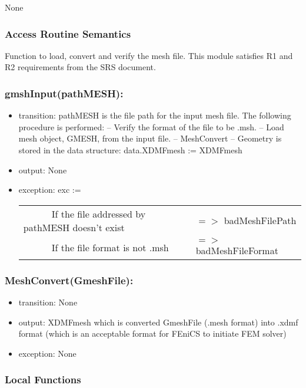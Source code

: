 \documentclass[12pt, titlepage]{article}
\begin{document}
	None
	
	\subsubsection{Access Routine Semantics}
	
	Function to load, convert and verify the mesh file. This module satisfies R1 and
	R2 requirements from the SRS document.
	
	\subsubsection*{gmshInput(pathMESH):} \begin{itemize} \item transition: pathMESH
		is the file path for the input mesh file. The following procedure is performed:
		\subitem -- Verify the format of the file to be .msh. \subitem -- Load mesh
		object, GMESH, from the input file. \subitem -- MeshConvert \subitem -- Geometry
		is stored in the data structure: data.XDMFmesh := XDMFmesh
		
		\item output: None \item exception: exc :=  \noindent \begin{longtable*}[l]{l l} \ \ \
			\ \ \ If the file addressed by pathMESH doesn't exist & $=>$ badMeshFilePath\\
			\ \ \ \ \ \ If the file format is not .msh & $=>$ badMeshFileFormat\\
		\end{longtable*}
		
		
	\end{itemize}
	
	
	\subsubsection*{MeshConvert(GmeshFile):} \begin{itemize} \item transition: None
		\item output: XDMFmesh which is converted GmeshFile (.mesh format) into .xdmf
		format (which is an acceptable format for FEniCS to initiate FEM solver) \item
		exception: None \end{itemize}
	
	
	\subsubsection{Local Functions}
	
\end{document}
